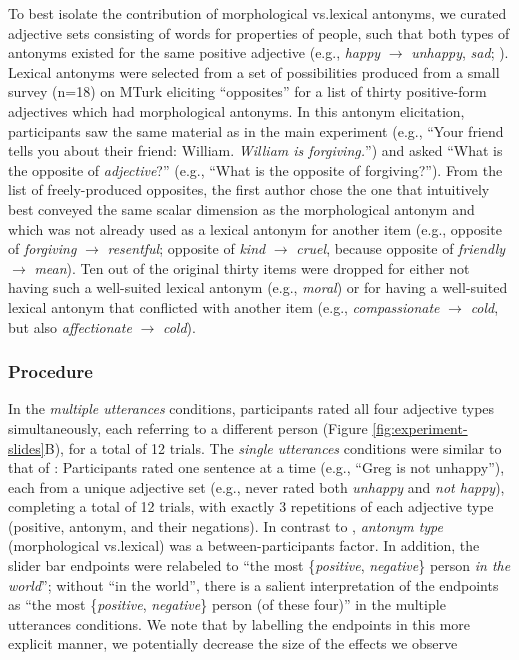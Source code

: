 \documentclass[floatsintext,doc]{apa6}
\begin{document}
To best isolate the contribution of morphological vs.\text{~}lexical antonyms, we curated adjective sets consisting of words for properties of people, such that both types of antonyms existed for the same positive adjective (e.g., \emph{happy} \(\rightarrow\) \emph{unhappy}, \emph{sad}; ).
Lexical antonyms were selected from a set of possibilities produced from a small survey (n=18) on MTurk eliciting \enquote{opposites} for a list of thirty positive-form adjectives which had morphological antonyms.
In this antonym elicitation, participants saw the same material as in the main experiment (e.g., ``Your friend tells you about their friend: William. \emph{William is forgiving.}'') and asked \enquote{What is the opposite of \emph{adjective}?} (e.g., ``What is the opposite of forgiving?'').
From the list of freely-produced opposites, the first author chose the one that intuitively best conveyed the same scalar dimension as the morphological antonym and which was not already used as a lexical antonym for another item (e.g., opposite of \emph{forgiving} \(\rightarrow\) \emph{resentful}; opposite of \emph{kind} \(\rightarrow\) \emph{cruel}, because opposite of \emph{friendly} \(\rightarrow\) \emph{mean}).
Ten out of the original thirty items were dropped for either not having such a well-suited lexical antonym (e.g., \emph{moral}) or for having a well-suited lexical antonym that conflicted with another item (e.g., \emph{compassionate} \(\rightarrow\) \emph{cold}, but also \emph{affectionate} \(\rightarrow\) \emph{cold}).

\subsubsection{Procedure}\label{procedure-1}%

In the \emph{multiple utterances} conditions, participants rated all four adjective types simultaneously, each referring to a different person (Figure \ref{fig:experiment-slides}B), for a total of 12 trials.
The \emph{single utterances} conditions were similar to that of : Participants rated one sentence at a time (e.g., \enquote{Greg is not unhappy}), each from a unique adjective set (e.g., never rated both \emph{unhappy} and \emph{not happy}), completing a total of 12 trials, with exactly 3 repetitions of each adjective type (positive, antonym, and their negations).
In contrast to , \emph{antonym type} (morphological vs.\text{~}lexical) was a between-participants factor.
In addition, the slider bar endpoints were relabeled to \enquote{the most \{\emph{positive}, \emph{negative}\} person \emph{in the world}}; without \enquote{in the world}, there is a salient interpretation of the endpoints as \enquote{the most \{\emph{positive}, \emph{negative}\} person (of these four)} in the multiple utterances conditions.
We note that by labelling the endpoints in this more explicit manner, we potentially decrease the size of the effects we observe 
\end{document}
